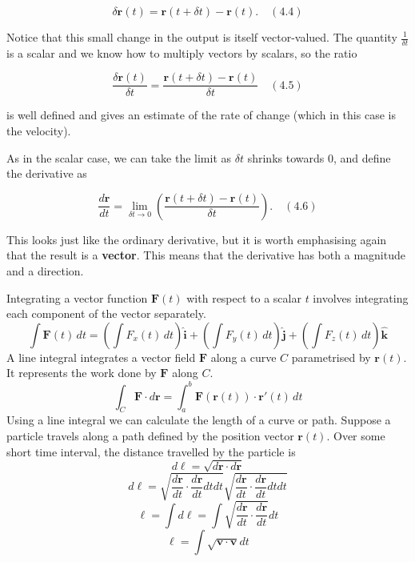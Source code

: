 \documentclass[11pt,titlepage]{article}
\numberwithin{equation}{subsection}
\begin{document}
\begin{equation}
\delta \mathbf{r}(t) = \mathbf{r}(t + \delta t) - \mathbf{r}(t). \quad (4.4)
\end{equation}

Notice that this small change in the output is itself vector-valued. The quantity $\frac{1}{\delta t}$ is a scalar and we know how to multiply vectors by scalars, so the ratio

\begin{equation}
\frac{\delta \mathbf{r}(t)}{\delta t} = \frac{\mathbf{r}(t + \delta t) - \mathbf{r}(t)}{\delta t} \quad (4.5)
\end{equation}

is well defined and gives an estimate of the rate of change (which in this case is the velocity).

As in the scalar case, we can take the limit as $\delta t$ shrinks towards 0, and define the derivative as

\begin{equation}
\frac{d\mathbf{r}}{dt} = \lim_{\delta t \to 0} \left( \frac{\mathbf{r}(t + \delta t) - \mathbf{r}(t)}{\delta t} \right). \quad (4.6)
\end{equation}

This looks just like the ordinary derivative, but it is worth emphasising again that the result is a \textbf{vector}. This means that the derivative has both a magnitude and a direction.

Integrating a vector function $\mathbf{F}(t)$ with respect to a scalar $t$ involves integrating each component of the vector separately.
    \begin{equation}
        \int \mathbf{F}(t) \, dt = \left( \int F_x(t) \, dt \right) \mathbf{\hat{i}} + \left( \int F_y(t) \, dt \right) \mathbf{\hat{j}} + \left( \int F_z(t) \, dt \right) \mathbf{\hat{k}}
    \end{equation}
A line integral integrates a vector field $\mathbf{F}$ along a curve $C$ parametrised by $\mathbf{r}(t)$. It represents the work done by $\mathbf{F}$ along $C$.
    \begin{equation}
        \int_C \mathbf{F} \cdot d\mathbf{r} = \int_a^b \mathbf{F}(\mathbf{r}(t)) \cdot \mathbf{r}'(t) \, dt
    \end{equation}
Using a line integral we can calculate the length of a curve or path. Suppose a particle travels along a path defined by the position vector $\mathbf{r}(t)$. Over some short time interval, the distance travelled by the particle is
\begin{equation}
    d\ell=\sqrt{d\mathbf{r}\cdot d\mathbf{r}}
\end{equation}
\begin{equation}
    d\ell=\sqrt{\frac{d\mathbf{r}}{dt}\cdot \frac{d\mathbf{r}}{dt}dtdt}\sqrt{\frac{d\mathbf{r}}{dt}\cdot \frac{d\mathbf{r}}{dt}dtdt}
\end{equation}
\begin{equation}
    \ell=\int d\ell=\int \sqrt{\frac{d\mathbf{r}}{dt}\cdot \frac{d\mathbf{r}}{dt}}dt
\end{equation}
\begin{equation}
    \ell=\int \sqrt{\textbf{v}\cdot \mathbf{v}}dt
\end{equation}
\end{document}
